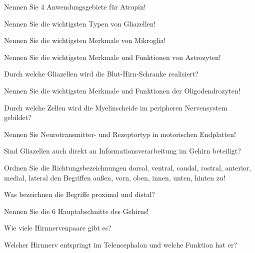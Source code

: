\documentclass[10pt, a4paper]{exam}
\begin{document}
\begin{questions}
  \question Nennen Sie 4 Anwendungsgebiete für Atropin!
  \begin{solution}
  \end{solution}
  \question Nennen Sie die wichtigsten Typen von Gliazellen!
  \begin{solution}
  \end{solution}
  \question Nennen Sie die wichtigsten Merkmale von Mikroglia!
  \begin{solution}
  \end{solution}
  \question Nennen Sie die wichtigsten Merkmale und Funktionen von Astrozyten!
  \begin{solution}
  \end{solution}
  \question Durch welche Gliazellen wird die Blut-Hirn-Schranke realisiert?
  \begin{solution}
  \end{solution}
  \question Nennen Sie die wichtigsten Merkmale und Funktionen der Oligodendrozyten!
  \begin{solution}
  \end{solution}
  \question Durch welche Zellen wird die Myelinscheide im peripheren Nervensystem gebildet?
  \begin{solution}
  \end{solution}
  \question Nennen Sie Neurotransmitter- und Rezeptortyp in motorischen Endplatten!
  \begin{solution}
  \end{solution}
  \question Sind Gliazellen auch direkt an Informationsverarbeitung im Gehirn beteiligt?
  \begin{solution}
  \end{solution}
  \question Ordnen Sie die Richtungsbezeichnungen dorsal, ventral, caudal, rostral, anterior, medial, lateral den Begriffen außen, vorn, oben, innen, unten, hinten zu!
  \begin{solution}
  \end{solution}
  \question Was bezeichnen die Begriffe proximal und distal?
  \begin{solution}
  \end{solution}
  \question Nennen Sie die 6 Hauptabschnitte des Gehirns!
  \begin{solution}
  \end{solution}
  \question Wie viele Hirnnervenpaare gibt es?
  \begin{solution}
  \end{solution}
  \question Welcher Hirnnerv entspringt im Telencephalon und welche Funktion hat er?

\end{questions}
\end{document}

